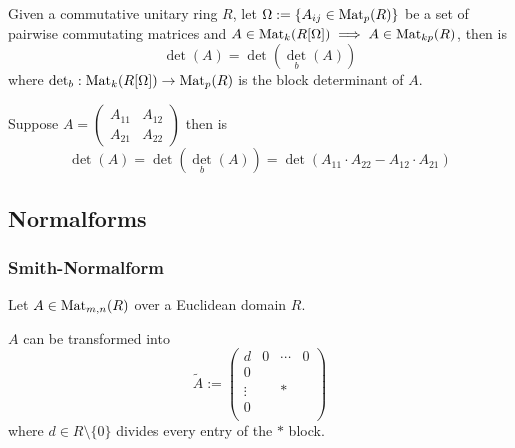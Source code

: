 \begin{proposition}
   Given a commutative unitary ring \(R\), let \(\Omega := \{A_{ij} \in \operatorname{Mat}_p(R)\}\) be a set of pairwise commutating matrices and \(A \in \operatorname{Mat}_k(R[\Omega]) \implies A \in \operatorname{Mat}_{kp}(R)\), then is
   \[\det(A) = \det(\det_b(A))\]
   where \(\det_b: \operatorname{Mat}_k(R[\Omega]) \to \operatorname{Mat}_p(R)\) is the block determinant of \(A\).
\end{proposition}
\begin{example}
   Suppose \(A = \begin{pmatrix}A_{11} & A_{12}\\A_{21} & A_{22}\end{pmatrix}\) then is
   \[\det(A) = \det(\det_b(A)) = \det(A_{11} \cdot A_{22} - A_{12} \cdot A_{21})\]
\end{example}

\subsection{Normalforms}
\subsubsection{Smith-Normalform}
\begin{lemma}\label{lem:a_div_mat}
   Let \(A \in \operatorname{Mat}_{m,n}(R)\) over a Euclidean domain \(R\).

   \(A\) can be transformed into
   \[\widetilde{A} := \left(\begin{array}{c|ccc}
      d      & 0 & \cdots &  0 \\
      \hline
      0      &   &        & \\
      \vdots &   & \ast   & \\
      0       &   &        & \\
   \end{array}\right)\]
   where \(d \in R \setminus \{0\}\) divides every entry of the \(\ast\) block.
\end{lemma}

